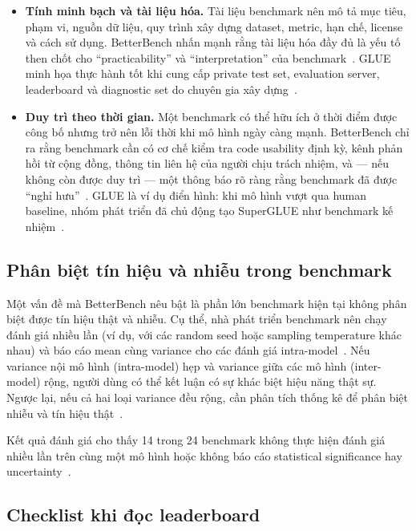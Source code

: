 \begin{itemize}
    \item \textbf{Tính minh bạch và tài liệu hóa.} Tài liệu benchmark nên mô tả mục tiêu, phạm vi, nguồn dữ liệu, quy trình xây dựng dataset, metric, hạn chế, license và cách sử dụng. BetterBench nhấn mạnh rằng tài liệu hóa đầy đủ là yếu tố then chốt cho ``practicability'' và ``interpretation'' của benchmark~\cite{betterbench}. GLUE minh họa thực hành tốt khi cung cấp private test set, evaluation server, leaderboard và diagnostic set do chuyên gia xây dựng~\cite{glue}.

    \item \textbf{Duy trì theo thời gian.} Một benchmark có thể hữu ích ở thời điểm được công bố nhưng trở nên lỗi thời khi mô hình ngày càng mạnh. BetterBench chỉ ra rằng benchmark cần có cơ chế kiểm tra code usability định kỳ, kênh phản hồi từ cộng đồng, thông tin liên hệ của người chịu trách nhiệm, và --- nếu không còn được duy trì --- một thông báo rõ ràng rằng benchmark đã được ``nghỉ hưu''~\cite{betterbench}. GLUE là ví dụ điển hình: khi mô hình vượt qua human baseline, nhóm phát triển đã chủ động tạo SuperGLUE như benchmark kế nhiệm~\cite{superglue}.
\end{itemize}

\subsection{Phân biệt tín hiệu và nhiễu trong benchmark}

Một vấn đề mà BetterBench nêu bật là phần lớn benchmark hiện tại không phân biệt được tín hiệu thật và nhiễu. Cụ thể, nhà phát triển benchmark nên chạy đánh giá nhiều lần (ví dụ, với các random seed hoặc sampling temperature khác nhau) và báo cáo mean cùng variance cho các đánh giá intra-model~\cite{betterbench}. Nếu variance nội mô hình (intra-model) hẹp và variance giữa các mô hình (inter-model) rộng, người dùng có thể kết luận có sự khác biệt hiệu năng thật sự. Ngược lại, nếu cả hai loại variance đều rộng, cần phân tích thống kê để phân biệt nhiễu và tín hiệu thật~\cite{betterbench}.

Kết quả đánh giá cho thấy 14 trong 24 benchmark không thực hiện đánh giá nhiều lần trên cùng một mô hình hoặc không báo cáo statistical significance hay uncertainty~\cite{betterbench}.

\subsection{Checklist khi đọc leaderboard}

